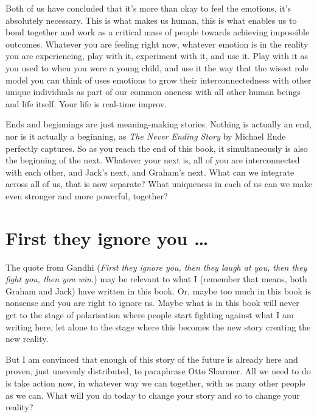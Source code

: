 Both of us have concluded that it's more than okay to feel the emotions, it's absolutely necessary. This is what makes us human, this is what enables us to bond together and work as a critical mass of people towards achieving impossible outcomes. Whatever you are feeling right now, whatever emotion is in the reality you are experiencing, play with it, experiment with it, and use it. Play with it as you used to when you were a young child, and use it the way that the wisest role model you can think of uses emotions to grow their interconnectedness with other unique individuals as part of our common oneness with all other human beings and life itself. Your life is real-time improv.


Ends and beginnings are just meaning-making stories. Nothing is actually an end, nor is it actually a beginning, as  \emph{The Never Ending Story}\cite{ende-never} by Michael Ende perfectly captures. So as you reach the end of this book, it simultaneously is also the beginning of the next. Whatever your next is, all of you are interconnected with each other, and Jack's next, and Graham's next. What can we integrate across all of us, that is now separate? What uniqueness in each of us can we make even stronger and more powerful, together?






\section{First they ignore you \ldots}
The quote from Gandhi (\emph{First they ignore you, then they laugh at you, then they fight you, then you win.}) may be relevant to what I (remember that means, both Graham and Jack) have written in this book. Or, maybe too much in this book is nonsense and you are right to ignore us. Maybe what is in this book will never get to the stage of polarisation where people start fighting against what I am writing here, let alone to the stage where this becomes the new story creating the new reality.


But I am convinced that enough of this story of the future is already here and proven, just unevenly distributed, to paraphrase Otto Sharmer.  All we need to do is take action now, in whatever way we can together, with as many other people as we can. What will you do today to change your story and so to change your reality?




